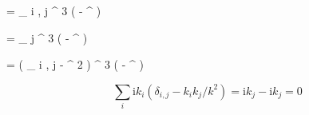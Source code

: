 \be\label{eq1.4.15}
 =  \hbar \delta _ { i , j } \delta ^ { 3 } \left(  -  ^ { \prime } \right)
\ee

\be\label{eq1.4.16}
 =  \hbar \partial _ { j } \delta ^ { 3 } \left(  -  ^ { \prime } \right)
\ee

\be\label{eq1.4.17}
 =  \hbar \left( \delta _ { i , j } -  { \nabla ^ { 2 } } \right) \delta ^ { 3 } \left(  -  ^ { \prime } \right)
\ee

\[\sum _ { i } \mathrm { i } k _ { i } \left( \delta _ { i , j } - k _ { i } k _ { j } / k ^ { 2 } \right) = \mathrm { i } k _ { j } - \mathrm { i } k _ { j } = 0 \]


















